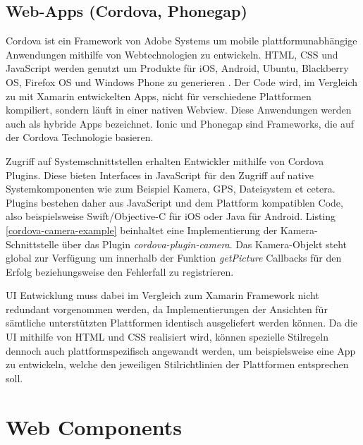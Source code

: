 \newpage


\subsection{Web-Apps (Cordova, Phonegap)}

Cordova ist ein Framework von Adobe Systems um mobile plattformunabhängige Anwendungen mithilfe von Webtechnologien zu entwickeln.
\ac{HTML}, \ac{CSS} und JavaScript werden genutzt um Produkte für iOS, Android, Ubuntu, Blackberry OS, Firefox OS und Windows Phone zu generieren \cite{Cordo26:online}.
Der Code wird, im Vergleich zu mit Xamarin entwickelten Apps, nicht für verschiedene Plattformen kompiliert,
sondern läuft in einer nativen Webview. Diese Anwendungen werden auch als hybride Apps bezeichnet.
Ionic und Phonegap sind Frameworks, die auf der Cordova Technologie basieren.

Zugriff auf Systemschnittstellen erhalten Entwickler mithilfe von Cordova Plugins. Diese bieten
Interfaces in JavaScript für den Zugriff auf native Systemkomponenten wie zum Beispiel Kamera, GPS, Dateisystem et cetera.
Plugins bestehen daher aus JavaScript und dem Plattform kompatiblen Code,
also beispielsweise Swift/Objective-C für iOS oder Java für Android.
Listing \ref{cordova-camera-example} beinhaltet eine Implementierung der Kamera-Schnittstelle über das Plugin \emph{cordova-plugin-camera}.
Das Kamera-Objekt steht global zur Verfügung um innerhalb der Funktion \emph{getPicture} Callbacks für den Erfolg beziehungsweise den Fehlerfall zu registrieren.

\ac{UI} Entwicklung muss dabei im Vergleich zum Xamarin Framework nicht redundant vorgenommen werden, da Implementierungen der
Ansichten für sämtliche unterstützten Plattformen identisch ausgeliefert werden können.
Da die \ac{UI} mithilfe von \ac{HTML} und \ac{CSS} realisiert wird,
können spezielle Stilregeln dennoch auch plattformspezifisch angewandt werden, um beispielsweise eine App zu entwickeln,
welche den jeweiligen Stilrichtlinien der Plattformen entsprechen soll.

\vspace{0.3cm}

\vspace{0.3cm}

\newpage
\section{Web Components}
\label{sec:webcomponents}


